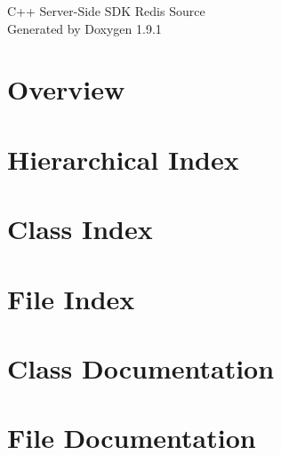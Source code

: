 \let\mypdfximage\pdfximage\def\pdfximage{\immediate\mypdfximage}\documentclass[twoside]{book}
\newcommand{\+}{\discretionary{\mbox{\scriptsize$\hookleftarrow$}}{}{}}
\newcommand{\clearemptydoublepage}{%
  \newpage{\pagestyle{empty}\cleardoublepage}%
}
\begin{document}
\raggedbottom

\hypersetup{pageanchor=false,
             bookmarksnumbered=true,
             pdfencoding=unicode
            }
\begin{titlepage}
\vspace*{7cm}
\begin{center}%
{\Large C++ Server-\/\+Side SDK Redis Source }\\
\vspace*{1cm}
{\large Generated by Doxygen 1.9.1}\\
\end{center}
\end{titlepage}
\clearemptydoublepage
{}
\tableofcontents
\clearemptydoublepage
{}
\hypersetup{pageanchor=true}

\chapter{Overview}
\label{index}\hypertarget{index}{}
\chapter{Hierarchical Index}

\chapter{Class Index}

\chapter{File Index}

\chapter{Class Documentation}




\chapter{File Documentation}





\backmatter
\newpage
{}
\clearemptydoublepage
{}
\printindex
\end{document}
